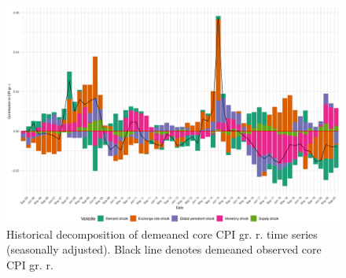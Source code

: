 \documentclass[12pt, a4paper]{extarticle}
\begin{document}
\begin{figure}
	\centering
	\includegraphics[width=0.95\linewidth]{figures/hd_core_cpi_full}
	\caption[]{Historical decomposition of demeaned core CPI gr. r. time series (seasonally adjusted). Black line denotes demeaned observed core CPI gr. r.}
	\label{fig:hd_core_cpi_full}
\end{figure}


~\\
\clearpage
\newpage
\pagebreak
\end{document}
